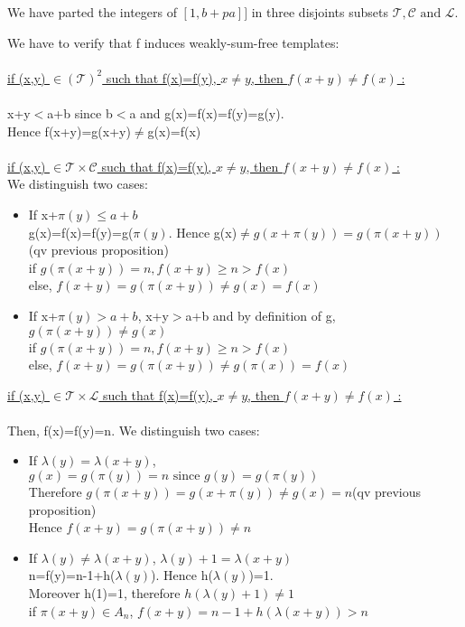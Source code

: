 We have parted the integers of \(\![1,b+pa]\!]\) in three disjoints subsets \(\mathcal{T},\mathcal{C} \text{ and } \mathcal{L}\).

We have to verify that f induces weakly-sum-free templates:\\
\\
\underline{if (x,y) \(\in (\mathcal{T})^2\) such that f(x)=f(y), \(x \neq y\), then \(f(x+y)\neq f(x)\)  :}\\
\\x+y\(<\)a+b since b\(<\)a and g(x)=f(x)=f(y)=g(y).
\\Hence f(x+y)=g(x+y)\(\neq\)g(x)=f(x)
\\\\
\underline{if (x,y) \(\in \mathcal{T} \times \mathcal{C}\) such that f(x)=f(y), \(x \neq y\), then \(f(x+y)\neq f(x)\)  :}\\
We distinguish two cases:


\begin{itemize}
\item If x+\(\pi(y)\leqslant a+b\)
\\g(x)=f(x)=f(y)=g(\(\pi(y)\). Hence g(x)\(\neq g(x+\pi(y))=g(\pi(x+y))\) (qv previous proposition)
\\if \(g(\pi(x+y))=n, f(x+y)\geqslant n > f(x)\)
\\else, \(f(x+y)=g(\pi(x+y))\neq g(x)=f(x)\)
\item If x+\(\pi(y)> a+b\), x+y\(>\)a+b and by definition of g, \(g(\pi(x+y))\neq g(x)\)
\\if \(g(\pi(x+y))=n, f(x+y)\geqslant n > f(x)\)
\\else, \(f(x+y)=g(\pi(x+y))\neq g(\pi(x))=f(x)\)
\end{itemize}


\underline{if (x,y) \(\in \mathcal{T} \times \mathcal{L}\) such that f(x)=f(y), \(x \neq y\), then \(f(x+y)\neq f(x)\)  :}\\
\\Then, f(x)=f(y)=n. We distinguish two cases:


\begin{itemize}
\item If \(\lambda(y)=\lambda(x+y)\),
\\\(g(x)=g(\pi(y))=n \text{ since } g(y)=g(\pi(y))\)
\\Therefore \(g(\pi(x+y))=g(x+\pi(y)) \neq g(x)=n\)(qv previous proposition)
\\Hence \(f(x+y)=g(\pi(x+y))\neq n\)
\item If  \(\lambda(y)\neq \lambda(x+y)\), \(\lambda(y)+1= \lambda(x+y)\)\\
n=f(y)=n-1+h(\(\lambda(y)\)). Hence h(\(\lambda(y)\))=1.
\\Moreover h(1)=1, therefore \(h(\lambda(y)+1) \neq 1\)
\\if \(\pi(x+y) \in A_n\), \(f(x+y)=n-1+h(\lambda(x+y))>n\)
\end{itemize}

